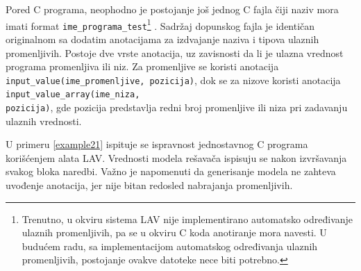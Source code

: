 \documentclass[12pt,oneside]{memoir}
\begin{document}
Pored C programa, neophodno je postojanje još jednog C fajla
čiji naziv mora imati format \texttt{ime\_programa\_test}\footnote{Trenutno, u okviru sistema LAV nije implementirano automatsko određivanje ulaznih promenljivih, pa se u okviru C koda anotiranje mora navesti. U budućem radu, sa implementacijom automatskog određivanja ulaznih promenljivih, postojanje ovakve datoteke nece biti potrebno.}
. Sadržaj dopunskog fajla je identičan originalnom sa dodatim anotacijama za izdvajanje naziva i tipova ulaznih promenljivih. Postoje dve vrste anotacija, uz zavisnosti da li je ulazna vrednost programa promenljiva ili niz. Za promenljive se koristi anotacija 
\texttt{input\_value(ime\_promenljive, pozicija)}, dok se za nizove koristi 
anotacija \texttt{input\_value\_array(ime\_niza, \\pozicija)}, gde pozicija predstavlja redni broj promenljive ili niza pri zadavanju ulaznih vrednosti. 
\par
U primeru \ref{example21} ispituje se ispravnost jednostavnog C programa korišćenjem alata LAV. Vrednosti modela rešavača ispisuju se nakon izvršavanja svakog bloka naredbi. Važno je napomenuti da generisanje modela ne zahteva uvođenje anotacija, jer nije bitan redosled nabrajanja promenljivih. 
\end{document}
